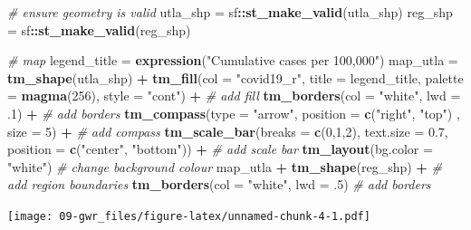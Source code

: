 \documentclass[
]{book}
\newenvironment{Shaded}{\begin{snugshade}}{\end{snugshade}}
\newcommand{\CommentTok}[1]{\textcolor[rgb]{0.56,0.35,0.01}{\textit{#1}}}
\newcommand{\DataTypeTok}[1]{\textcolor[rgb]{0.13,0.29,0.53}{#1}}
\newcommand{\DecValTok}[1]{\textcolor[rgb]{0.00,0.00,0.81}{#1}}
\newcommand{\FloatTok}[1]{\textcolor[rgb]{0.00,0.00,0.81}{#1}}
\newcommand{\KeywordTok}[1]{\textcolor[rgb]{0.13,0.29,0.53}{\textbf{#1}}}
\newcommand{\NormalTok}[1]{#1}
\newcommand{\OperatorTok}[1]{\textcolor[rgb]{0.81,0.36,0.00}{\textbf{#1}}}
\newcommand{\StringTok}[1]{\textcolor[rgb]{0.31,0.60,0.02}{#1}}
\begin{document}
\begin{Shaded}
\begin{Highlighting}[]
\CommentTok{# ensure geometry is valid}
\NormalTok{utla_shp =}\StringTok{ }\NormalTok{sf}\OperatorTok{::}\KeywordTok{st_make_valid}\NormalTok{(utla_shp)}
\NormalTok{reg_shp =}\StringTok{ }\NormalTok{sf}\OperatorTok{::}\KeywordTok{st_make_valid}\NormalTok{(reg_shp)}

\CommentTok{# map}
\NormalTok{legend_title =}\StringTok{ }\KeywordTok{expression}\NormalTok{(}\StringTok{"Cumulative cases per 100,000"}\NormalTok{)}
\NormalTok{map_utla =}\StringTok{ }\KeywordTok{tm_shape}\NormalTok{(utla_shp) }\OperatorTok{+}
\StringTok{  }\KeywordTok{tm_fill}\NormalTok{(}\DataTypeTok{col =} \StringTok{"covid19_r"}\NormalTok{, }\DataTypeTok{title =}\NormalTok{ legend_title, }\DataTypeTok{palette =} \KeywordTok{magma}\NormalTok{(}\DecValTok{256}\NormalTok{), }\DataTypeTok{style =} \StringTok{"cont"}\NormalTok{) }\OperatorTok{+}\StringTok{ }\CommentTok{# add fill}
\StringTok{  }\KeywordTok{tm_borders}\NormalTok{(}\DataTypeTok{col =} \StringTok{"white"}\NormalTok{, }\DataTypeTok{lwd =} \FloatTok{.1}\NormalTok{)  }\OperatorTok{+}\StringTok{ }\CommentTok{# add borders}
\StringTok{  }\KeywordTok{tm_compass}\NormalTok{(}\DataTypeTok{type =} \StringTok{"arrow"}\NormalTok{, }\DataTypeTok{position =} \KeywordTok{c}\NormalTok{(}\StringTok{"right"}\NormalTok{, }\StringTok{"top"}\NormalTok{) , }\DataTypeTok{size =} \DecValTok{5}\NormalTok{) }\OperatorTok{+}\StringTok{ }\CommentTok{# add compass}
\StringTok{  }\KeywordTok{tm_scale_bar}\NormalTok{(}\DataTypeTok{breaks =} \KeywordTok{c}\NormalTok{(}\DecValTok{0}\NormalTok{,}\DecValTok{1}\NormalTok{,}\DecValTok{2}\NormalTok{), }\DataTypeTok{text.size =} \FloatTok{0.7}\NormalTok{, }\DataTypeTok{position =}  \KeywordTok{c}\NormalTok{(}\StringTok{"center"}\NormalTok{, }\StringTok{"bottom"}\NormalTok{)) }\OperatorTok{+}\StringTok{ }\CommentTok{# add scale bar}
\StringTok{  }\KeywordTok{tm_layout}\NormalTok{(}\DataTypeTok{bg.color =} \StringTok{"white"}\NormalTok{) }\CommentTok{# change background colour}
\NormalTok{map_utla }\OperatorTok{+}\StringTok{ }\KeywordTok{tm_shape}\NormalTok{(reg_shp) }\OperatorTok{+}\StringTok{ }\CommentTok{# add region boundaries}
\StringTok{  }\KeywordTok{tm_borders}\NormalTok{(}\DataTypeTok{col =} \StringTok{"white"}\NormalTok{, }\DataTypeTok{lwd =} \FloatTok{.5}\NormalTok{) }\CommentTok{# add borders}
\end{Highlighting}
\end{Shaded}

\texttt{[image: 09-gwr\_files/figure-latex/unnamed-chunk-4-1.pdf]}
\end{document}
